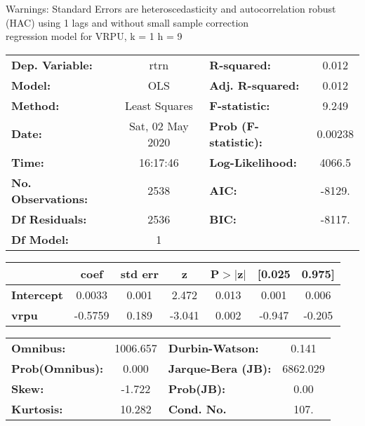 Warnings: \newline
 [1] Standard Errors are heteroscedasticity and autocorrelation robust (HAC) using 1 lags and without small sample correction\\ 

regression model for VRPU, k = 1 h = 9\begin{center}
\begin{tabular}{lclc}
\toprule
\textbf{Dep. Variable:}    &       rtrn       & \textbf{  R-squared:         } &     0.012   \\
\textbf{Model:}            &       OLS        & \textbf{  Adj. R-squared:    } &     0.012   \\
\textbf{Method:}           &  Least Squares   & \textbf{  F-statistic:       } &     9.249   \\
\textbf{Date:}             & Sat, 02 May 2020 & \textbf{  Prob (F-statistic):} &  0.00238    \\
\textbf{Time:}             &     16:17:46     & \textbf{  Log-Likelihood:    } &    4066.5   \\
\textbf{No. Observations:} &        2538      & \textbf{  AIC:               } &    -8129.   \\
\textbf{Df Residuals:}     &        2536      & \textbf{  BIC:               } &    -8117.   \\
\textbf{Df Model:}         &           1      & \textbf{                     } &             \\
\bottomrule
\end{tabular}
\begin{tabular}{lcccccc}
                   & \textbf{coef} & \textbf{std err} & \textbf{z} & \textbf{P$> |$z$|$} & \textbf{[0.025} & \textbf{0.975]}  \\
\midrule
\textbf{Intercept} &       0.0033  &        0.001     &     2.472  &         0.013        &        0.001    &        0.006     \\
\textbf{vrpu}      &      -0.5759  &        0.189     &    -3.041  &         0.002        &       -0.947    &       -0.205     \\
\bottomrule
\end{tabular}
\begin{tabular}{lclc}
\textbf{Omnibus:}       & 1006.657 & \textbf{  Durbin-Watson:     } &    0.141  \\
\textbf{Prob(Omnibus):} &   0.000  & \textbf{  Jarque-Bera (JB):  } & 6862.029  \\
\textbf{Skew:}          &  -1.722  & \textbf{  Prob(JB):          } &     0.00  \\
\textbf{Kurtosis:}      &  10.282  & \textbf{  Cond. No.          } &     107.  \\
\bottomrule
\end{tabular}
\end{center}

